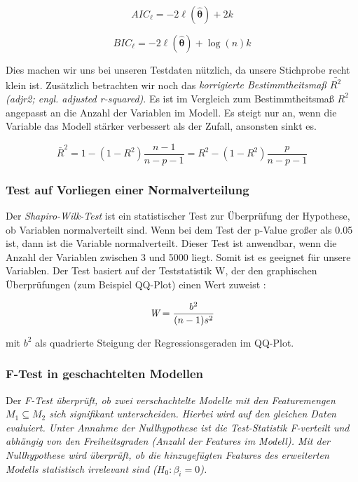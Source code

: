 $$\displaystyle AIC_{\ell }=-2\ell (\mathbf {\hat {\theta }} )+2k$$

$$\displaystyle BIC_{\ell }=-2\ell (\mathbf {\hat {\theta }} )+\log(n)k$$

Dies machen wir uns bei unseren Testdaten nützlich, da unsere Stichprobe recht klein ist.
Zusätzlich betrachten wir noch das \emph{korrigierte Bestimmtheitsmaß  $\bar{R^2}$ (adjr2; engl. \it{adjusted r-squared})}.
Es ist im Vergleich zum Bestimmtheitsmaß $R^2$ angepasst an die Anzahl der Variablen im Modell.
Es steigt nur an, wenn die Variable das Modell stärker verbessert als der Zufall, ansonsten sinkt es.

$$\bar R^2 = 1- (1-R^2) \frac{n-1}{n-p-1} = R^2 - (1-R^2) \frac{p}{n-p-1}$$

\subsubsection{Test auf Vorliegen einer Normalverteilung}

Der \emph{Shapiro-Wilk-Test} ist ein statistischer Test zur Überprüfung der Hypothese, ob Variablen normalverteilt sind. Wenn bei dem Test der p-Value großer als 0.05 ist, dann ist die Variable normalverteilt.
Dieser Test ist anwendbar, wenn die Anzahl der Variablen zwischen 3 und 5000 liegt.
Somit ist es geeignet für unsere Variablen. Der Test basiert auf der Teststatistik W, der den graphischen Überprüfungen (zum Beispiel QQ-Plot) einen Wert zuweist \cite{2012shapiro}:

$$\textit{W} = {{b^2}\over {(n-1)s^2}}$$


\noindent mit $b^2$ als quadrierte Steigung der Regressionsgeraden im QQ-Plot.

\subsubsection{F-Test in geschachtelten Modellen}
Der \it{F-Test} überprüft, ob zwei verschachtelte Modelle mit den Featuremengen $M_1 \subseteq M_2$ sich signifikant unterscheiden.
Hierbei wird auf den gleichen Daten evaluiert.
Unter Annahme der Nullhypothese ist die Test-Statistik F-verteilt und abhängig von den Freiheitsgraden (Anzahl der Features im Modell).
Mit der Nullhypothese wird überprüft, ob die hinzugefügten Features des erweiterten Modells statistisch irrelevant sind ($H_0: \beta_i = 0$).

